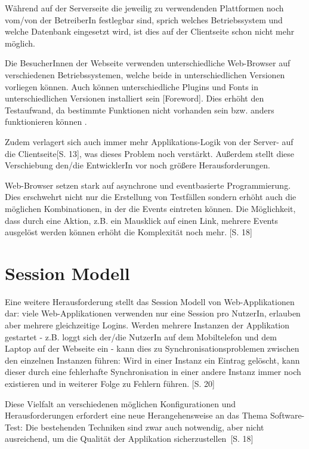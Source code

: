\documentclass[a4paper,bibtotoc,oneside]{scrbook}
\begin{document}
Während auf der Serverseite die jeweilig zu verwendenden Plattformen noch vom/von der BetreiberIn festlegbar sind, sprich welches Betriebssystem und welche Datenbank eingesetzt wird, ist dies auf der Clientseite schon nicht mehr möglich. 

Die BesucherInnen der Webseite verwenden unterschiedliche Web-Browser auf verschiedenen Betriebssystemen, welche beide in unterschiedlichen Versionen vorliegen können. Auch können unterschiedliche Plugins und Fonts in unterschiedlichen Versionen installiert sein \cite{testing_apps_on_web}[Foreword]. Dies erhöht den Testaufwand, da bestimmte Funktionen nicht vorhanden sein bzw. anders funktionieren können \cite{caniuse}.

Zudem verlagert sich auch immer mehr Applikations-Logik von der Server- auf die Clientseite\cite{testing_apps_on_web}[S. 13], was dieses Problem noch verstärkt. Außerdem stellt diese Verschiebung den/die EntwicklerIn vor noch größere Herausforderungen.

Web-Browser setzen stark auf asynchrone und eventbasierte Programmierung. Dies erschwehrt nicht nur die Erstellung von Testfällen sondern erhöht auch die möglichen Kombinationen, in der die Events eintreten können. Die Möglichkeit, dass durch eine Aktion, z.B. ein Mausklick auf einen Link, mehrere Events ausgelöst werden können erhöht die Komplexität noch mehr. \cite{testing_apps_on_web}[S. 18]

\section{Session Modell}
Eine weitere Herausforderung stellt das Session Modell von Web-Applikationen dar: viele Web-Applikationen verwenden nur eine Session pro NutzerIn, erlauben aber mehrere gleichzeitige Logins. Werden mehrere Instanzen der Applikation gestartet - z.B. loggt sich der/die NutzerIn auf dem Mobiltelefon und dem Laptop auf der Webseite ein - kann dies zu Synchronisationsproblemen zwischen den einzelnen Instanzen führen: Wird in einer Instanz ein Eintrag gelöscht, kann dieser durch eine fehlerhafte Synchronisation in einer andere Instanz immer noch existieren und in weiterer Folge zu Fehlern führen. \cite{testing_apps_on_web}[S. 20]

Diese Vielfalt an verschiedenen möglichen Konfigurationen und Herausforderungen erfordert eine neue Herangehensweise an das Thema Software-Test: Die bestehenden Techniken sind \glqq zwar auch notwendig, aber nicht ausreichend, um die Qualität der Applikation sicherzustellen\grqq\ \cite{eval_automat_webapp_test}[S. 18]
\end{document}
